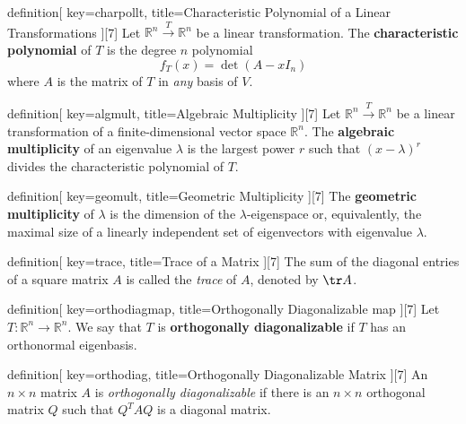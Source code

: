 \begin{SaveConcept}{definition}[
		key=charpollt,
		title={Characteristic Polynomial of a Linear Transformations}
	][7]
	Let $\mathbb R^n \overset{T}\longrightarrow \mathbb R^n$ be a linear transformation. The {\bf characteristic polynomial} of $T$ is the degree $n$ polynomial
	$$
        f_T(x) = \det (A - x I_n)
        $$ 
        where $A$ is the matrix of $T$ in {\it any} basis of $V$. 
\end{SaveConcept}


\begin{SaveConcept}{definition}[
		key=algmult,
		title={Algebraic Multiplicity}
	][7]
        Let $\mathbb R^n \overset{T}\longrightarrow \mathbb R^n$ be a linear transformation of a finite-dimensional vector space $\mathbb R^n$. The {\bf algebraic multiplicity} of an eigenvalue $\lambda$ is the largest power $r$ such that $(x-\lambda)^r$ divides the characteristic polynomial of $T$.
\end{SaveConcept}


\begin{SaveConcept}{definition}[
		key=geomult,
		title={Geometric Multiplicity}
	][7]
        The {\bf geometric multiplicity} of  $\lambda$ is the dimension of the $\lambda$-eigenspace or, equivalently, the maximal size of a linearly independent set of eigenvectors with eigenvalue $\lambda$.
\end{SaveConcept}

\begin{SaveConcept}{definition}[
		key=trace,
		title={Trace of a Matrix}
	][7]
        The sum of the diagonal entries of a square matrix $A$ is called the \textit{trace} of $A$, denoted by $\tr A$. 
\end{SaveConcept}


\begin{SaveConcept}{definition}[
		key=orthodiagmap,
		title={Orthogonally Diagonalizable map}
	][7]
	Let $T:\mathbb R^n\to \mathbb R^n$. We say that $T$ is {\bf orthogonally diagonalizable} if  $T$ has an orthonormal eigenbasis.
\end{SaveConcept}

\begin{SaveConcept}{definition}[
		key=orthodiag,
		title={Orthogonally Diagonalizable Matrix}
	][7]
	An $n\times n$ matrix $A$ is \emph{orthogonally diagonalizable} if there is an $n\times n$ orthogonal matrix $Q$ such that $Q^TAQ$ is a diagonal matrix.
\end{SaveConcept}

